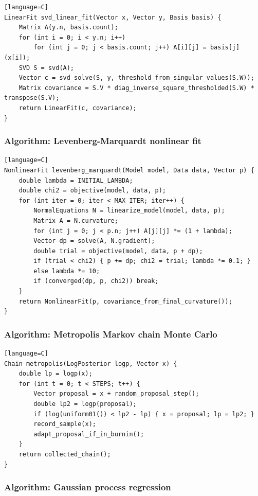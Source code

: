 \documentclass[11pt]{article}
\begin{document}
\begin{verbatim}[language=C]
LinearFit svd_linear_fit(Vector x, Vector y, Basis basis) {
    Matrix A(y.n, basis.count);
    for (int i = 0; i < y.n; i++)
        for (int j = 0; j < basis.count; j++) A[i][j] = basis[j](x[i]);
    SVD S = svd(A);
    Vector c = svd_solve(S, y, threshold_from_singular_values(S.W));
    Matrix covariance = S.V * diag_inverse_square_thresholded(S.W) * transpose(S.V);
    return LinearFit(c, covariance);
}
\end{verbatim}

\subsubsection{Algorithm: Levenberg-Marquardt nonlinear fit}\label{algorithm-levenberg-marquardt-nonlinear-fit}

\begin{verbatim}[language=C]
NonlinearFit levenberg_marquardt(Model model, Data data, Vector p) {
    double lambda = INITIAL_LAMBDA;
    double chi2 = objective(model, data, p);
    for (int iter = 0; iter < MAX_ITER; iter++) {
        NormalEquations N = linearize_model(model, data, p);
        Matrix A = N.curvature;
        for (int j = 0; j < p.n; j++) A[j][j] *= (1 + lambda);
        Vector dp = solve(A, N.gradient);
        double trial = objective(model, data, p + dp);
        if (trial < chi2) { p += dp; chi2 = trial; lambda *= 0.1; }
        else lambda *= 10;
        if (converged(dp, p, chi2)) break;
    }
    return NonlinearFit(p, covariance_from_final_curvature());
}
\end{verbatim}

\subsubsection{Algorithm: Metropolis Markov chain Monte Carlo}\label{algorithm-metropolis-markov-chain-monte-carlo}

\begin{verbatim}[language=C]
Chain metropolis(LogPosterior logp, Vector x) {
    double lp = logp(x);
    for (int t = 0; t < STEPS; t++) {
        Vector proposal = x + random_proposal_step();
        double lp2 = logp(proposal);
        if (log(uniform01()) < lp2 - lp) { x = proposal; lp = lp2; }
        record_sample(x);
        adapt_proposal_if_in_burnin();
    }
    return collected_chain();
}
\end{verbatim}

\subsubsection{Algorithm: Gaussian process regression}\label{algorithm-gaussian-process-regression}
\end{document}
